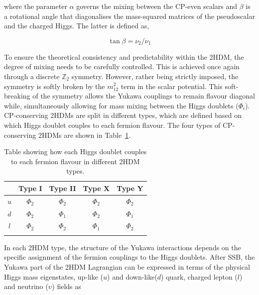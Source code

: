 where the parameter $\alpha$ governs the mixing between the CP-even scalars and $\beta$ is a rotational angle that diagonalises the mass-squared matrices of the pseudoscalar and the charged Higgs. The latter is defined as,

\begin{equation}
    \tan{\beta} = \nu_2/\nu_1
\end{equation}

To ensure the theoretical consistency and predictability within the 2HDM, the degree of mixing needs to be carefully controlled. This is achieved once again through a discrete $\mathbb{Z}_2$ symmetry. However, rather being strictly imposed, the symmetry is softly broken by the $m_{12}^2$ term in the scalar potential. This soft-breaking of the symmetry allows the Yukawa couplings to remain flavour diagonal while, simultaneously allowing for mass mixing between the Higgs doublets ($\Phi_i$). CP-conserving 2HDMs are split in different types, which are defined based on which Higgs doublet couples to each fermion flavour. The four types of CP-conserving 2HDMs are shown in Table~\ref{Table:Chapter2_2HDM-Types}.

\begin{table}[h]
\centering
\renewcommand{\arraystretch}{1.5} %
\setlength{\tabcolsep}{12pt} %
\begin{tabular}{|c|c|c|c|c|}
\hline
    & Type I   & Type II  & Type X   & Type Y   \\ \hline \hline
$u$ & $\Phi_2$ & $\Phi_2$ & $\Phi_2$ & $\Phi_2$ \\ 
\arrayrulecolor{lightgray} \hline
$d$ & $\Phi_2$ & $\Phi_1$ & $\Phi_2$ & $\Phi_1$ \\ 
\arrayrulecolor{lightgray} \hline
$l$ & $\Phi_2$ & $\Phi_2$ & $\Phi_1$ & $\Phi_2$ \\ 
\arrayrulecolor{black} \hline
\end{tabular}
\caption{Table showing how each Higgs doublet couples to each fermion flavour in different 2HDM types.}
\label{Table:Chapter2_2HDM-Types}
\end{table}

In each 2HDM type, the structure of the Yukawa interactions depends on the specific assignment of the fermion couplings to the Higgs doublets. After SSB, the Yukawa part of the 2HDM Lagrangian can be expressed in terms of the physical Higgs mass eigenstates, up-like ($u$) and down-like($d$) quark, charged lepton ($l$) and neutrino ($\upsilon$) fields as

